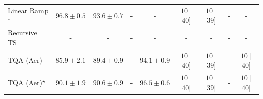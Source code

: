 \begin{tabular}{l|cccc|cccc|}
Linear Ramp$^\star$ & {\cellcolor[HTML]{903104}} \color[HTML]{F1F1F1} $96.8\pm 0.5$ & {\cellcolor[HTML]{CC4C02}} \color[HTML]{F1F1F1} $93.6\pm 0.7$ & {\cellcolor[HTML]{000000}} \color[HTML]{F1F1F1} {\cellcolor{white}} \color{black} - & {\cellcolor[HTML]{000000}} \color[HTML]{F1F1F1} {\cellcolor{white}} \color{black} - & {\cellcolor[HTML]{FFF7F3}} \color[HTML]{000000} $10$ [$40$] & {\cellcolor[HTML]{FFF7F3}} \color[HTML]{000000} $10$ [$39$] & {\cellcolor[HTML]{000000}} \color[HTML]{F1F1F1} {\cellcolor{white}} \color{black} - & {\cellcolor[HTML]{000000}} \color[HTML]{F1F1F1} {\cellcolor{white}} \color{black} - \\
Recursive TS & {\cellcolor[HTML]{000000}} \color[HTML]{F1F1F1} {\cellcolor{white}} \color{black} - & {\cellcolor[HTML]{000000}} \color[HTML]{F1F1F1} {\cellcolor{white}} \color{black} - & {\cellcolor[HTML]{000000}} \color[HTML]{F1F1F1} {\cellcolor{white}} \color{black} - & {\cellcolor[HTML]{000000}} \color[HTML]{F1F1F1} {\cellcolor{white}} \color{black} - & {\cellcolor[HTML]{000000}} \color[HTML]{F1F1F1} {\cellcolor{white}} \color{black} - & {\cellcolor[HTML]{000000}} \color[HTML]{F1F1F1} {\cellcolor{white}} \color{black} - & {\cellcolor[HTML]{000000}} \color[HTML]{F1F1F1} {\cellcolor{white}} \color{black} - & {\cellcolor[HTML]{000000}} \color[HTML]{F1F1F1} {\cellcolor{white}} \color{black} - \\
TQA (Aer) & {\cellcolor[HTML]{FEBE4A}} \color[HTML]{000000} $85.9\pm 2.1$ & {\cellcolor[HTML]{F6861F}} \color[HTML]{F1F1F1} $89.4\pm 0.9$ & {\cellcolor[HTML]{000000}} \color[HTML]{F1F1F1} {\cellcolor{white}} \color{black} - & {\cellcolor[HTML]{C34802}} \color[HTML]{F1F1F1} $94.1\pm 0.9$ & {\cellcolor[HTML]{FFF7F3}} \color[HTML]{000000} $10$ [$40$] & {\cellcolor[HTML]{FFF7F3}} \color[HTML]{000000} $10$ [$39$] & {\cellcolor[HTML]{000000}} \color[HTML]{F1F1F1} {\cellcolor{white}} \color{black} - & {\cellcolor[HTML]{FFF7F3}} \color[HTML]{000000} $10$ [$40$] \\
TQA (Aer)$^\star$ & {\cellcolor[HTML]{F17C1A}} \color[HTML]{F1F1F1} $90.1\pm 1.9$ & {\cellcolor[HTML]{EE7416}} \color[HTML]{F1F1F1} $90.6\pm 0.9$ & {\cellcolor[HTML]{000000}} \color[HTML]{F1F1F1} {\cellcolor{white}} \color{black} - & {\cellcolor[HTML]{943304}} \color[HTML]{F1F1F1} $96.5\pm 0.6$ & {\cellcolor[HTML]{FFF7F3}} \color[HTML]{000000} $10$ [$40$] & {\cellcolor[HTML]{FFF7F3}} \color[HTML]{000000} $10$ [$39$] & {\cellcolor[HTML]{000000}} \color[HTML]{F1F1F1} {\cellcolor{white}} \color{black} - & {\cellcolor[HTML]{FFF7F3}} \color[HTML]{000000} $10$ [$40$] \\

\end{tabular}

